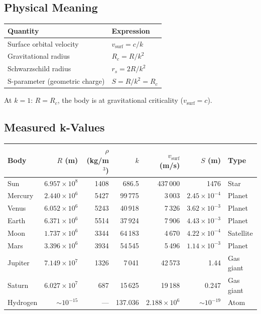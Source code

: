 \subsection{Physical Meaning}

\begin{center}
\begin{tabular}{ll}
\hline
\textbf{Quantity} & \textbf{Expression} \\
\hline
Surface orbital velocity & $v_{\text{surf}} = c/k$ \\
Gravitational radius & $R_c = R/k^2$ \\
Schwarzschild radius & $r_s = 2R/k^2$ \\
S-parameter (geometric charge) & $S = R/k^2 = R_c$ \\
\hline
\end{tabular}
\end{center}

At $k = 1$: $R = R_c$, the body is at gravitational criticality ($v_{\text{surf}} = c$).

\subsection{Measured k-Values}

\begin{center}
\begin{tabular}{lrrrrrl}
\hline
\textbf{Body} & $R$ (m) & $\rho$ (kg/m$^3$) & $k$ & $v_{\text{surf}}$ (m/s) & $S$ (m) & \textbf{Type} \\
\hline
Sun      & $6.957 \times 10^8$  & 1408 & 686.5   & 437\,000 & 1476   & Star \\
Mercury  & $2.440 \times 10^6$  & 5427 & 99\,775  & 3\,003   & $2.45 \times 10^{-4}$ & Planet \\
Venus    & $6.052 \times 10^6$  & 5243 & 40\,918  & 7\,326   & $3.62 \times 10^{-3}$ & Planet \\
Earth    & $6.371 \times 10^6$  & 5514 & 37\,924  & 7\,906   & $4.43 \times 10^{-3}$ & Planet \\
Moon     & $1.737 \times 10^6$  & 3344 & 64\,183  & 4\,670   & $4.22 \times 10^{-4}$ & Satellite \\
Mars     & $3.396 \times 10^6$  & 3934 & 54\,545  & 5\,496   & $1.14 \times 10^{-3}$ & Planet \\
Jupiter  & $7.149 \times 10^7$  & 1326 & 7\,041   & 42\,573  & 1.44   & Gas giant \\
Saturn   & $6.027 \times 10^7$  &  687 & 15\,625  & 19\,188  & 0.247  & Gas giant \\
Hydrogen & $\sim 10^{-15}$     & ---  & 137.036  & $2.188 \times 10^6$ & $\sim 10^{-19}$ & Atom \\
\hline
\end{tabular}
\end{center}


